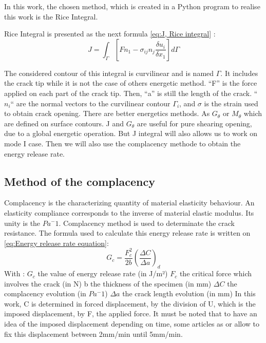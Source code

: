 In this work, the chosen method, which is created in a Python program to realise this work is the Rice Integral.

Rice Integral is presented as the next formula \ref{eq:J, Rice integral} :
\begin{equation}
	J=\int_{\Gamma}[F n_{1}-\sigma_{ij} n_{j} \frac{\delta u_{i}}{\delta x_{1}}]d\Gamma
	\label{eq:J, Rice integral}
\end{equation}  

The considered contour of this integral is curvilinear and is named $\Gamma$. It includes the crack tip while it is not the case of others energetic method. “F” is the force applied on each part of the crack tip. Then, “a” is still the length of the crack. “$n_i$“ are the normal vectors to the curvilinear contour $\Gamma_{i}$, and $\sigma$ is the strain used to obtain crack opening. 
There are better energetics methods. As $G_{\theta}$ or $M_{\theta}$ which are defined on surface contours. J and $G_{\theta}$ are useful for pure shearing opening, due to a global energetic operation. But J integral will also allows us to work on mode I case. Then we will also use the complacency methode to obtain the energy release rate.


\subsection{Method of the complacency}

Complacency is the characterizing quantity of material elasticity behaviour. An elasticity compliance corresponds to the inverse of material elastic modulus. Its unity is the $Pa^-1$.
Complacency method is used to determinate the crack resistance. 
The formula used to calculate this energy release rate is written on \ref{eq:Energy release rate equation}:
\begin{equation}
	G_{c}= \frac{F_{c}^2}{2b} (\frac{\Delta C}{\Delta a})_{d} 	
	\label{eq:Energy release rate equation}
\end{equation}  
With : 
$G_c$ the value of energy release rate (in J/m²)
$F_c$ the critical force which involves the crack (in N)
b the thickness of the specimen (in mm)
$\Delta C$ the complacency evolution (in $Pa^-1$)
$\Delta a$ the crack length evolution (in mm)
In this work, C is determined in forced displacement, by the division of U, which is the imposed displacement, by F, the applied force. It must be noted that to have an idea of the imposed displacement depending on time, some articles as \parencite{Reference7} or \parencite{reference15} allow to fix this displacement between 2mm/min until 5mm/min.

